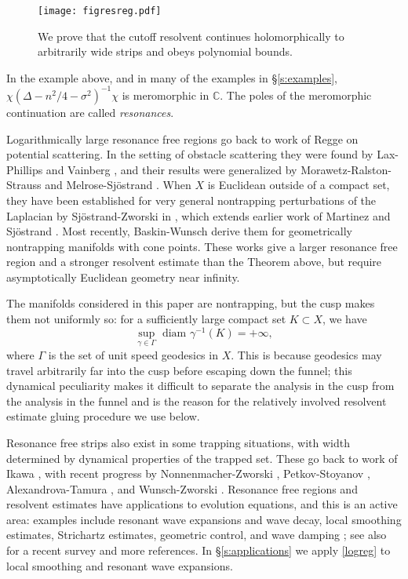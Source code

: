 \documentclass[reqno, 12pt]{amsart}
\newcommand \R {\mathbb{R}}
\newcommand \C {\mathbb{C}}
\DeclareMathOperator \im {Im}
\theoremstyle{definition}
\numberwithin{equation}{section}
\numberwithin{prop}{section}
\numberwithin{figure}{section}
\begin{document}
\begin{figure}[htbp]
\texttt{[image: figresreg.pdf]}
\caption{%
We prove that the cutoff resolvent continues holomorphically to arbitrarily wide strips and obeys polynomial bounds. %
}\label{f:intro}
\end{figure}

In the example above, and in many of the examples in \S\ref{s:examples}, $\chi (\Delta - n^2/4 - \sigma^2)^{-1} \chi$ is meromorphic in $\C$. The poles of the meromorphic continuation  %
are called \emph{resonances}.

Logarithmically large resonance free regions go back to work of Regge \cite{regge} on potential scattering. In the setting of obstacle scattering they were found by Lax-Phillips \cite{lp} and Vainberg \cite{v}, and their results were generalized by Morawetz-Ralston-Strauss \cite{mrs} and Melrose-Sj\"ostrand \cite{ms}. When $X$ is Euclidean outside of a compact set, they have been established for very general nontrapping perturbations of the Laplacian by Sj\"ostrand-Zworski in \cite[Theorem 1]{sz}, which extends earlier work of Martinez \cite{m} and Sj\"ostrand \cite{s}. Most recently, Baskin-Wunsch \cite{bw} derive them for geometrically nontrapping manifolds with cone points. These works give a larger resonance free region and a stronger resolvent estimate than the Theorem above, but require asymptotically Euclidean geometry near infinity.

The manifolds considered in this paper are  nontrapping, but the cusp makes them not uniformly so: for a sufficiently large compact set $K \subset X$, we have 
\[\sup_{\gamma \in \Gamma} \textrm{ diam }\gamma^{-1}(K) = +\infty,\]
where $\Gamma$ is the set of unit speed geodesics in $X$. This is because geodesics may travel arbitrarily far into the cusp before escaping down the funnel; this dynamical peculiarity makes it difficult to separate the analysis in the cusp from the analysis in the funnel and is the reason for the relatively involved resolvent estimate gluing procedure  we use below.

Resonance free strips also exist in some trapping situations, with width determined by dynamical properties of the trapped set.  These go back to work of Ikawa \cite{ik}, with recent progress  by Nonnenmacher-Zworski \cite{nz}, Petkov-Stoyanov \cite{ps}, Alexandrova-Tamura \cite{at}, and Wunsch-Zworski \cite{wz}. 
Resonance free regions and resolvent estimates have  applications to evolution equations, and this is an active area: examples include resonant wave expansions and  wave decay, local smoothing estimates,  Strichartz  estimates, geometric control, and wave damping \cite{bur:smoothing, bz, bh, msv, gn, chr:mrl,  bgh,  Dyatlov:Asymptotic, csvw}; see also \cite{wsur} for a recent survey and more references.  In \S\ref{s:applications} we apply  \eqref{logreg} to local smoothing  and resonant wave expansions.
\end{document}
